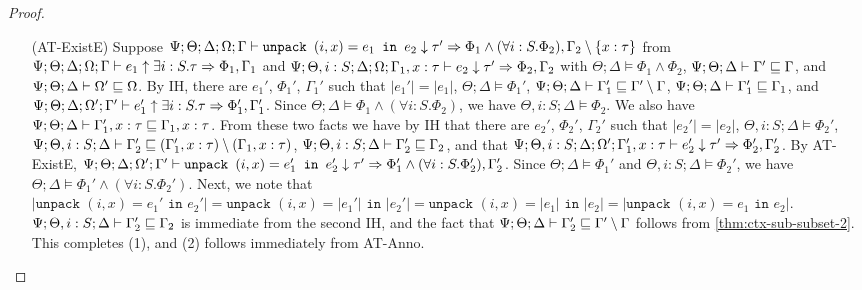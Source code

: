\begin{proof}
\begin{itemize}
   \item[(AT-ExistE)]
   Suppose $\Psi ; \Theta ; \Delta ; \Omega ; \Gamma\vdash \texttt{unpack } (i,x) = e_1 \texttt{ in } e_2 \downarrow \tau' \Rightarrow \Phi_1 \wedge (\forall i : S. \Phi_2) , \Gamma_2 \setminus \{x : \tau\}$
   from 
   $\Psi ; \Theta ; \Delta ; \Omega ; \Gamma\vdash e_1 \uparrow \exists i : S.\tau \Rightarrow \Phi_1, \Gamma_1$
   and 
   $\Psi ; \Theta, i : S ; \Delta ; \Omega ; \Gamma_1, x : \tau \vdash e_2 \downarrow \tau' \Rightarrow \Phi_2, \Gamma_2$
   with $\Theta ; \Delta \vDash \Phi_1 \wedge \Phi_2$,
   $\Psi ; \Theta ; \Delta \vdash \Gamma' \sqsubseteq \Gamma$, and
   $\Psi ; \Theta ; \Delta \vdash \Omega' \sqsubseteq \Omega$.
   By IH, there are $e_1'$, $\Phi_1'$, $\Gamma_1'$ such that 
   $|e_1'| = |e_1|$,
   $\Theta ; \Delta \vDash \Phi_1'$,
   $\Psi ; \Theta ; \Delta \vdash \Gamma_1' \sqsubseteq \Gamma' \setminus \Gamma$,
   $\Psi ; \Theta ; \Delta \vdash \Gamma_1' \sqsubseteq \Gamma_1$, and
   $\Psi ; \Theta ; \Delta ; \Omega' ; \Gamma'\vdash e_1' \uparrow \exists i : S.\tau \Rightarrow \Phi_1', \Gamma_1'$.
   Since $\Theta ; \Delta \vDash \Phi_1 \wedge (\forall i : S. \Phi_2)$, we have $\Theta, i : S ; \Delta \vDash \Phi_2$. We also have $\Psi ; \Theta ; \Delta \vdash \Gamma_1', x : \tau \sqsubseteq \Gamma_1, x : \tau$. From these two facts we have
   by IH that there are $e_2'$, $\Phi_2'$, $\Gamma_2'$ such that
   $|e_2'| = |e_2|$,
   $\Theta, i : S ; \Delta \vDash \Phi_2'$,
   $\Psi ; \Theta, i : S ; \Delta \vdash \Gamma_2' \sqsubseteq (\Gamma_1', x : \tau) \setminus (\Gamma_1, x : \tau)$,
   $\Psi ; \Theta, i : S ; \Delta \vdash \Gamma_2' \sqsubseteq \Gamma_2$, and that
   $\Psi ; \Theta, i : S ; \Delta ; \Omega' ; \Gamma_1', x : \tau \vdash e_2' \downarrow \tau' \Rightarrow \Phi_2',\Gamma_2'$.
   By AT-ExistE, 
   $\Psi ; \Theta ; \Delta ; \Omega' ; \Gamma' \vdash \texttt{unpack } (i,x) = e_1' \texttt{ in } e_2' \downarrow \tau' \Rightarrow \Phi_1' \wedge (\forall i : S. \Phi_2'), \Gamma_2'$.
   Since $\Theta ; \Delta \vDash \Phi_1'$ and $\Theta, i : S; \Delta \vDash \Phi_2'$, we have $\Theta ; \Delta \vDash \Phi_1' \wedge (\forall i : S. \Phi_2')$.
   Next, we note that $|\texttt{unpack } (i,x) = e_1' \texttt{ in } e_2'| = \texttt{unpack } (i,x) = |e_1'| \texttt{ in } |e_2'| = \texttt{unpack } (i,x) = |e_1| \texttt{ in } |e_2| = |\texttt{unpack } (i,x) = e_1 \texttt{ in } e_2|$. $\Psi ; \Theta, i : S ; \Delta \vdash \Gamma_2' \sqsubseteq \Gamma_2$ is immediate from the second IH, and the fact that $\Psi ; \Theta ; \Delta \vdash \Gamma_2' \sqsubseteq \Gamma' \setminus \Gamma$ follows from \autoref{thm:ctx-sub-subset-2}. This completes (1), and (2) follows immediately from AT-Anno.
   

\end{itemize}
\end{proof}
